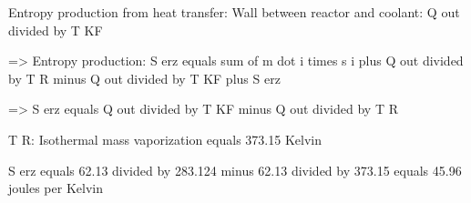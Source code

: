 Entropy production from heat transfer:  
Wall between reactor and coolant:  
Q out divided by T KF  

=> Entropy production:  
S erz equals sum of m dot i times s i plus Q out divided by T R minus Q out divided by T KF plus S erz  

=> S erz equals Q out divided by T KF minus Q out divided by T R  

T R: Isothermal mass vaporization equals 373.15 Kelvin  

S erz equals 62.13 divided by 283.124 minus 62.13 divided by 373.15 equals 45.96 joules per Kelvin